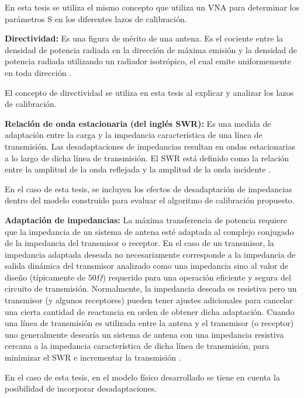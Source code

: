 En esta tesis se utiliza el mismo concepto que utiliza un VNA para determinar los parámetros S en los diferentes lazos de 
calibración.

{\textbf{Directividad:}} Es una figura de mérito de una antena. Es el cociente entre la densidad de potencia radiada en la
dirección de máxima emisión y la densidad de potencia radiada utilizando un radiador isotrópico, el cual emite uniformemente
en toda dirección \cite{Standard1996}.

El concepto de directividad se utiliza en esta tesis al explicar y analizar los lazos de calibración.

{\textbf{Relación de onda estacionaria (del inglés SWR):}} Es una medida de adaptación entre la carga y la impedancia
característica de una línea de transmisión. Las desadaptaciones de impedancias resultan en ondas estacionarias a lo largo de
dicha línea de transmisión. El SWR está definido como la relación entre la amplitud de la onda reflejada y la amplitud de la
onda incidente \cite{swrWiki}.

En el caso de esta tesis, se incluyen los efectos de desadaptación de impedancias dentro del modelo construido para evaluar el
algoritmo de calibración propuesto.

{\textbf{Adaptación de impedancias:}} La máxima transferencia de potencia requiere que la impedancia de un sistema de
antena esté adaptada al complejo conjugado de la impedancia del transmisor o receptor. En el caso de un transmisor,
la impedancia adaptada deseada no necesariamente corresponde a la impedancia de salida dinámica del transmisor analizado
como una impedancia sino al valor de diseño (típicamente de $50 \Omega$) requerido para una operación eficiente
y segura del circuito de transmisión. Normalmente, la impedancia deseada es resistiva pero un transmisor (y algunos receptores)
pueden tener ajustes adicionales para cancelar una cierta cantidad de reactancia en orden de obtener dicha adaptación. Cuando
una línea de transmisión es utilizada entre la antena y el transmisor (o receptor) uno generalmente desearía un sistema de antena
con una impedancia resistiva cercana a la impedancia característica de dicha línea de transmisión, para minimizar el SWR
e incrementar la transmisión \cite{AntennaWiki}.

En el caso de esta tesis, en el modelo físico desarrollado se tiene en cuenta la posibilidad de incorporar desadaptaciones.

